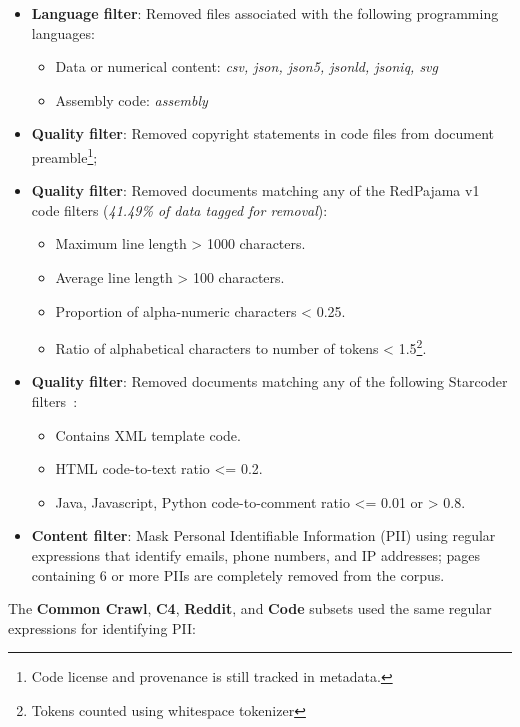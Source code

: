 \begin{itemize}[leftmargin=1em]
    \item \textbf{Language filter}: Removed files associated with the following programming languages:
    \begin{itemize}
        \item Data or numerical content: \textit{csv, json, json5, jsonld, jsoniq, svg}
        \item Assembly code: \textit{assembly}
    \end{itemize}
    \item \textbf{Quality filter}: Removed copyright statements in code files from document preamble\footnote{Code license and provenance is still tracked in metadata.};
    \item \textbf{Quality filter}: Removed documents matching any of the RedPajama v1~\citep{together2023redpajama} code filters (\textit{41.49\% of data tagged for removal}):
    \begin{itemize}
    \item Maximum line length > 1000 characters.
    \item Average line length > 100 characters.
    \item Proportion of alpha-numeric characters < 0.25.
    \item Ratio of alphabetical characters to number of tokens < 1.5\footnote{Tokens counted using whitespace tokenizer}.
    \end{itemize}
    \item \textbf{Quality filter}: Removed documents matching any of the following Starcoder filters~\citep{Li2023StarCoderMT}:
    \begin{itemize}
        \item Contains XML template code.
        \item HTML code-to-text ratio <= 0.2.
        \item Java, Javascript, Python code-to-comment ratio <= 0.01 or > 0.8.
    \end{itemize}
    \item  \textbf{Content filter}: Mask Personal Identifiable Information (PII) using regular expressions that identify emails, phone numbers, 
    and IP addresses; pages containing 6 or more PIIs are completely removed from the corpus. 
\end{itemize}

The \textbf{Common Crawl}, \textbf{C4}, \textbf{Reddit}, and \textbf{Code} subsets used the same regular expressions for identifying PII:

